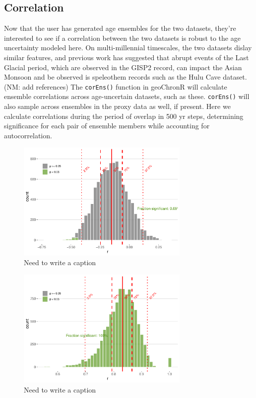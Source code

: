 \documentclass[gchron, manuscript]{copernicus}
\begin{document}
\subsection{Correlation}

Now that the user has generated age ensembles for the two datasets, they're interested to see if a correlation between the two datasets is robust to the age uncertainty modeled here.
On multi-millennial timescales, the two datasets dislay similar features, and previous work has suggested that abrupt events of the Last Glacial period, which are observed in the GISP2 record, can impact the Asian Monsoon and be observed is speleothem records such as the Hulu Cave dataset. (NM: add references)
The \texttt{corEns()} function in geoChronR will calculate ensemble correlations across age-uncertain datasets, such as these.
\texttt{corEns()} will also sample across ensembles in the proxy data as well, if present.
Here we calculate correlations during the period of overlap in 500 yr steps, determining significance for each pair of ensemble members while accounting for autocorrelation.

\begin{figure}
\includegraphics[width=8.3cm]{geoChronR-paper_files/figure-latex/cor-hist-1} \caption{Need to write a caption}\label{fig:cor-hist}
\end{figure}

\begin{figure}
\includegraphics[width=8.3cm]{geoChronR-paper_files/figure-latex/hulu-cor-hist-1} \caption{Need to write a caption}\label{fig:hulu-cor-hist}
\end{figure}
\end{document}
